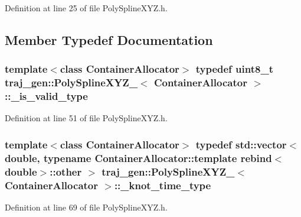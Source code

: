 Definition at line 25 of file Poly\+Spline\+X\+Y\+Z.\+h.



\subsection{Member Typedef Documentation}
\subsubsection[{\texorpdfstring{\+\_\+is\+\_\+valid\+\_\+type}{_is_valid_type}}]{\setlength{\rightskip}{0pt plus 5cm}template$<$class Container\+Allocator$>$ typedef uint8\+\_\+t {\bf traj\+\_\+gen\+::\+Poly\+Spline\+X\+Y\+Z\+\_\+}$<$ Container\+Allocator $>$\+::{\bf \+\_\+is\+\_\+valid\+\_\+type}}\hypertarget{structtraj__gen_1_1_poly_spline_x_y_z___aad18c8f3814cfb1c65ca0a3a068f8327}{}\label{structtraj__gen_1_1_poly_spline_x_y_z___aad18c8f3814cfb1c65ca0a3a068f8327}


Definition at line 51 of file Poly\+Spline\+X\+Y\+Z.\+h.

\subsubsection[{\texorpdfstring{\+\_\+knot\+\_\+time\+\_\+type}{_knot_time_type}}]{\setlength{\rightskip}{0pt plus 5cm}template$<$class Container\+Allocator$>$ typedef std\+::vector$<$double, typename Container\+Allocator\+::template rebind$<$double$>$\+::other $>$ {\bf traj\+\_\+gen\+::\+Poly\+Spline\+X\+Y\+Z\+\_\+}$<$ Container\+Allocator $>$\+::{\bf \+\_\+knot\+\_\+time\+\_\+type}}\hypertarget{structtraj__gen_1_1_poly_spline_x_y_z___a64249b19835eb126ff0cad0498fa2cf9}{}\label{structtraj__gen_1_1_poly_spline_x_y_z___a64249b19835eb126ff0cad0498fa2cf9}


Definition at line 69 of file Poly\+Spline\+X\+Y\+Z.\+h.

